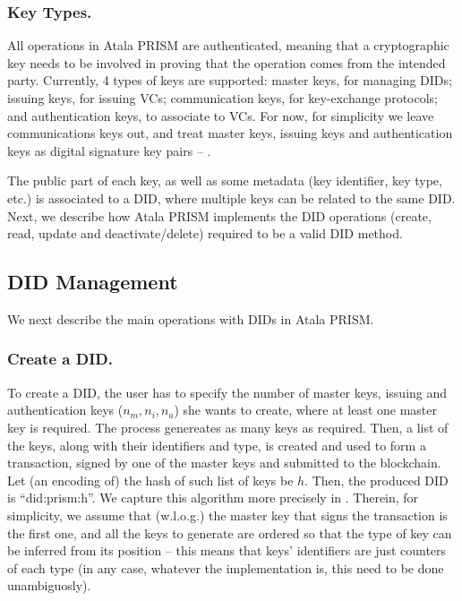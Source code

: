 \subsubsection{Key Types.} %
All operations in Atala PRISM are authenticated, meaning that a cryptographic
key needs to be involved in proving that the operation comes from the intended
party. Currently, 4 types of keys are supported: master keys, for managing DIDs;
issuing keys, for issuing VCs; communication keys, for key-exchange protocols;
and authentication keys, to associate to VCs. For now, for simplicity we leave
communications keys out, and treat master keys, issuing keys and authentication
keys as digital signature key pairs -- .

The public part of each key, as well as some metadata (key identifier, key type,
etc.) is associated to a DID, where multiple keys can be related to the same
DID. Next, we describe how Atala PRISM implements the DID operations (create,
read, update and deactivate/delete) required to be a valid DID method.

\subsection{DID Management}


We next describe the main operations with DIDs in Atala PRISM.

\subsubsection{Create a DID.} %
To create a DID, the user has to specify the number of master keys, issuing
and authentication keys ($n_m,n_i,n_a$) she wants to create, where at least one
master key is required. The process genereates as many keys as required. Then,
a list of the keys, along with their identifiers and type, is created and
used to form a transaction, signed by one of the master keys and submitted
to the blockchain. Let (an encoding of) the hash of such list of keys be $h$.
Then, the produced DID is ``did:prism:h''. We capture this algorithm more
precisely in . Therein, for simplicity, we assume that
(w.l.o.g.) the master key that signs the transaction is the first one, and
all the keys to generate are ordered so that the type of key can be inferred
from its position -- this means that keys' identifiers are just counters of
each type (in any case, whatever the implementation is, this need to be done
unambiguosly).

